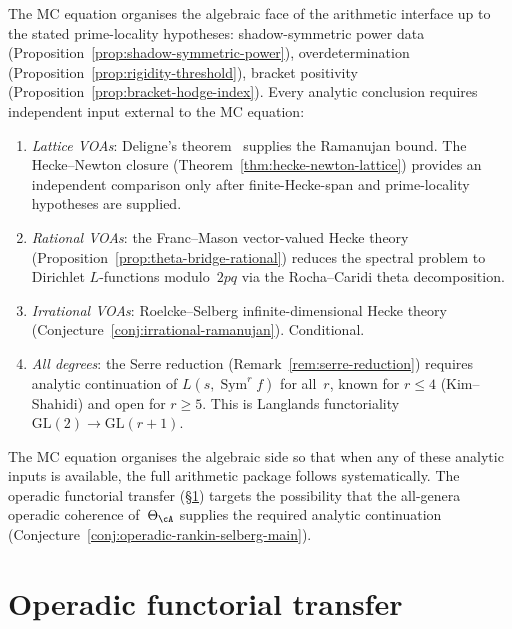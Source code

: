 \begin{remark}%
\label{rem:algebraic-analytic-divide}%
%
The MC equation organises the algebraic face of the
arithmetic interface up to the stated prime-locality hypotheses:
shadow-symmetric power data
(Proposition~\ref{prop:shadow-symmetric-power}),
overdetermination
(Proposition~\ref{prop:rigidity-threshold}),
bracket positivity
(Proposition~\ref{prop:bracket-hodge-index}).
Every analytic conclusion requires independent
input external to the MC equation:
\begin{enumerate}[label=\textup{(\roman*)}]
\item
\emph{Lattice VOAs}:
Deligne's theorem~\cite{Deligne1974} supplies the
Ramanujan bound.
The Hecke--Newton closure
(Theorem~\ref{thm:hecke-newton-lattice}) provides an
independent comparison only after finite-Hecke-span and
prime-locality hypotheses are supplied.
\item
\emph{Rational VOAs}:
the Franc--Mason vector-valued Hecke theory
(Proposition~\ref{prop:theta-bridge-rational}) reduces
the spectral problem to Dirichlet $L$-functions
modulo~$2pq$ via the Rocha--Caridi theta decomposition.
\item
\emph{Irrational VOAs}:
Roelcke--Selberg infinite-dimensional Hecke theory
(Conjecture~\ref{conj:irrational-ramanujan}).
Conditional.
\item
\emph{All degrees}:
the Serre reduction
(Remark~\ref{rem:serre-reduction}) requires analytic
continuation of $L(s,\operatorname{Sym}^r f)$ for
all~$r$, known for $r \leq 4$
(Kim--Shahidi) and open for $r \geq 5$.
This is Langlands functoriality
$\mathrm{GL}(2) \to \mathrm{GL}(r{+}1)$.
\end{enumerate}
The MC equation organises the algebraic side so that
when any of these analytic inputs is available, the full
arithmetic package follows systematically.
The operadic functorial transfer
(\S\ref{sec:operadic-transfer-theory}) targets
the possibility that the all-genera operadic coherence
of~$\Theta_\cA$ supplies the required
analytic continuation
(Conjecture~\ref{conj:operadic-rankin-selberg-main}).
\end{remark}

\section{Operadic functorial transfer}%
\label{sec:operadic-transfer-theory}%

